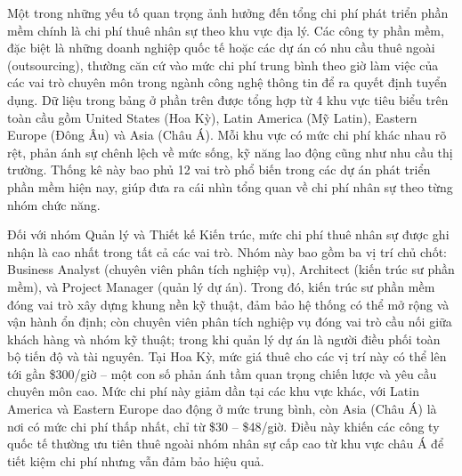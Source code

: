 \renewcommand{\labelitemi}{--}    
    
        \hspace*{0.8cm}Một trong những yếu tố quan trọng ảnh hưởng đến tổng chi phí phát triển phần mềm chính là chi phí thuê nhân sự theo khu vực địa lý. Các công ty phần mềm, đặc biệt là những doanh nghiệp quốc tế hoặc các dự án có nhu cầu thuê ngoài (outsourcing), thường căn cứ vào mức chi phí trung bình theo giờ làm việc của các vai trò chuyên môn trong ngành công nghệ thông tin để ra quyết định tuyển dụng. Dữ liệu trong bảng ở phần trên được tổng hợp từ 4 khu vực tiêu biểu trên toàn cầu gồm United States (Hoa Kỳ), Latin America (Mỹ Latin), Eastern Europe (Đông Âu) và Asia (Châu Á). Mỗi khu vực có mức chi phí khác nhau rõ rệt, phản ánh sự chênh lệch về mức sống, kỹ năng lao động cũng như nhu cầu thị trường. Thống kê này bao phủ 12 vai trò phổ biến trong các dự án phát triển phần mềm hiện nay, giúp đưa ra cái nhìn tổng quan về chi phí nhân sự theo từng nhóm chức năng.
    \vspace{0.5em}

    
      \hspace*{0.8cm}Đối với nhóm Quản lý và Thiết kế Kiến trúc, mức chi phí thuê nhân sự được ghi nhận là cao nhất trong tất cả các vai trò. Nhóm này bao gồm ba vị trí chủ chốt: Business Analyst (chuyên viên phân tích nghiệp vụ), Architect (kiến trúc sư phần mềm), và Project Manager (quản lý dự án). Trong đó, kiến trúc sư phần mềm đóng vai trò xây dựng khung nền kỹ thuật, đảm bảo hệ thống có thể mở rộng và vận hành ổn định; còn chuyên viên phân tích nghiệp vụ đóng vai trò cầu nối giữa khách hàng và nhóm kỹ thuật; trong khi quản lý dự án là người điều phối toàn bộ tiến độ và tài nguyên. Tại Hoa Kỳ, mức giá thuê cho các vị trí này có thể lên tới gần \$300/giờ – một con số phản ánh tầm quan trọng chiến lược và yêu cầu chuyên môn cao. Mức chi phí này giảm dần tại các khu vực khác, với Latin America và Eastern Europe dao động ở mức trung bình, còn Asia (Châu Á) là nơi có mức chi phí thấp nhất, chỉ từ \$30 – \$48/giờ. Điều này khiến các công ty quốc tế thường ưu tiên thuê ngoài nhóm nhân sự cấp cao từ khu vực châu Á để tiết kiệm chi phí nhưng vẫn đảm bảo hiệu quả.
    \vspace{0.5em}

